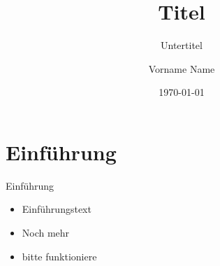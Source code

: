 \documentclass{f4_beamer}
\title{Titel}
\subtitle{Untertitel}
\author{Vorname Name}
\date{\today}
\begin{document}
\section{Einführung}

\begin{frame}{Einführung}
    \begin{itemize}
        \item Einführungstext
        \item Noch mehr
        \item bitte funktioniere
    \end{itemize}
\end{frame}



\end{document}

